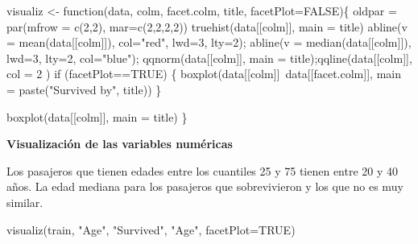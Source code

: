 \documentclass[
]{article}
\newenvironment{Shaded}{\begin{snugshade}}{\end{snugshade}}
\newcommand{\ControlFlowTok}[1]{\textcolor[rgb]{0.94,0.87,0.69}{#1}}
\newcommand{\DataTypeTok}[1]{\textcolor[rgb]{0.87,0.87,0.75}{#1}}
\newcommand{\DecValTok}[1]{\textcolor[rgb]{0.86,0.86,0.80}{#1}}
\newcommand{\KeywordTok}[1]{\textcolor[rgb]{0.94,0.87,0.69}{#1}}
\newcommand{\NormalTok}[1]{\textcolor[rgb]{0.80,0.80,0.80}{#1}}
\newcommand{\OperatorTok}[1]{\textcolor[rgb]{0.94,0.94,0.82}{#1}}
\newcommand{\OtherTok}[1]{\textcolor[rgb]{0.94,0.94,0.56}{#1}}
\newcommand{\StringTok}[1]{\textcolor[rgb]{0.80,0.58,0.58}{#1}}
\begin{document}
\begin{Shaded}
\begin{Highlighting}[]
\NormalTok{visualiz <-}\StringTok{ }\ControlFlowTok{function}\NormalTok{(data, colm, facet.colm, title, }\DataTypeTok{facetPlot=}\OtherTok{FALSE}\NormalTok{)\{}
\NormalTok{oldpar =}\StringTok{ }\KeywordTok{par}\NormalTok{(}\DataTypeTok{mfrow =} \KeywordTok{c}\NormalTok{(}\DecValTok{2}\NormalTok{,}\DecValTok{2}\NormalTok{), }\DataTypeTok{mar=}\KeywordTok{c}\NormalTok{(}\DecValTok{2}\NormalTok{,}\DecValTok{2}\NormalTok{,}\DecValTok{2}\NormalTok{,}\DecValTok{2}\NormalTok{))}
\KeywordTok{truehist}\NormalTok{(data[[colm]], }\DataTypeTok{main =}\NormalTok{ title)}
\KeywordTok{abline}\NormalTok{(}\DataTypeTok{v =} \KeywordTok{mean}\NormalTok{(data[[colm]]), }\DataTypeTok{col=}\StringTok{"red"}\NormalTok{, }\DataTypeTok{lwd=}\DecValTok{3}\NormalTok{, }\DataTypeTok{lty=}\DecValTok{2}\NormalTok{);}
\KeywordTok{abline}\NormalTok{(}\DataTypeTok{v =} \KeywordTok{median}\NormalTok{(data[[colm]]), }\DataTypeTok{lwd=}\DecValTok{3}\NormalTok{, }\DataTypeTok{lty=}\DecValTok{2}\NormalTok{, }\DataTypeTok{col=}\StringTok{"blue"}\NormalTok{);}
\KeywordTok{qqnorm}\NormalTok{(data[[colm]], }\DataTypeTok{main =}\NormalTok{ title);}\KeywordTok{qqline}\NormalTok{(data[[colm]], }\DataTypeTok{col =} \DecValTok{2}\NormalTok{ )}
\ControlFlowTok{if}\NormalTok{ (facetPlot}\OperatorTok{==}\OtherTok{TRUE}\NormalTok{) \{}
  \KeywordTok{boxplot}\NormalTok{(data[[colm]]}\OperatorTok{~}\NormalTok{data[[facet.colm]], }\DataTypeTok{main =} \KeywordTok{paste}\NormalTok{(}\StringTok{"Survived by"}\NormalTok{, title))}
\NormalTok{\}}

\KeywordTok{boxplot}\NormalTok{(data[[colm]], }\DataTypeTok{main =}\NormalTok{ title)}
\NormalTok{\}}
\end{Highlighting}
\end{Shaded}

\textbf{Visualización de las variables numéricas}

Los pasajeros que tienen edades entre los cuantiles 25 y 75 tienen entre
20 y 40 años. La edad mediana para los pasajeros que sobrevivieron y los
que no es muy similar.

\begin{Shaded}
\begin{Highlighting}[]
\KeywordTok{visualiz}\NormalTok{(train, }\StringTok{"Age"}\NormalTok{, }\StringTok{"Survived"}\NormalTok{, }\StringTok{"Age"}\NormalTok{, }\DataTypeTok{facetPlot=}\OtherTok{TRUE}\NormalTok{)}
\end{Highlighting}
\end{Shaded}
\end{document}
